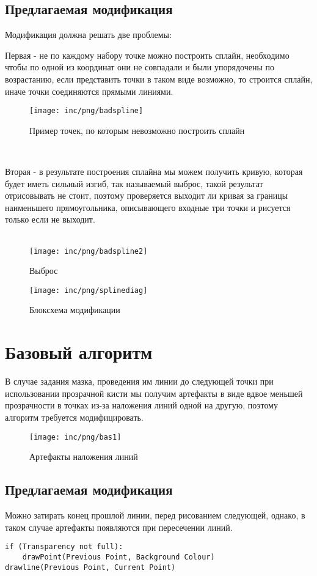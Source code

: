 \subsection{Предлагаемая модификация }
Модификация должна решать две проблемы:\\
\par Первая - не по каждому набору точке можно построить сплайн, необходимо чтобы по одной из координат они не совпадали и были упорядочены по возрастанию, если представить точки в таком виде возможно, то строится сплайн, иначе точки соединяются прямыми линиями.
\begin{figure}
	\centering
	\texttt{[image: inc/png/badspline]}
	\caption{Пример точек, по которым невозможно построить сплайн}
	\label{fig:fig07}
\end{figure} 
\\ \par Вторая - в результате построения сплайна мы можем получить кривую, которая будет иметь сильный изгиб, так называемый выброс, такой результат отрисовывать не стоит, поэтому проверяется выходит ли кривая за границы наименьшего прямоугольника, описывающего входные три точки и рисуется только если не выходит.\\\
\begin{figure}
	\centering
	\texttt{[image: inc/png/badspline2]}
	\caption{Выброс}
	\label{fig:fig08}
\end{figure} 
\begin{figure}
	\centering
	\texttt{[image: inc/png/splinediag]}
	\caption{Блоксхема модификации}
	\label{fig:fig09}
\end{figure} 


\section{Базовый алгоритм}
В случае задания мазка, проведения им линии до следующей точки при использовании прозрачной кисти мы получим артефакты в виде вдвое меньшей прозрачности в точках из-за наложения линий одной на другую, поэтому алгоритм требуется модифицировать.
\begin{figure}
	\centering
	\texttt{[image: inc/png/bas1]}
	\caption{Артефакты наложения линий}
	\label{fig:fig10}
\end{figure} 
\subsection{Предлагаемая модификация}
Можно затирать конец прошлой линии, перед рисованием следующей, однако, в таком случае артефакты появляются при пересечении линий.
\begin{lstlisting}[style=pseudocode,caption={Модификация базового алгоритма}]
if (Transparency not full):
	drawPoint(Previous Point, Background Colour)
drawline(Previous Point, Current Point)
\end{lstlisting}

